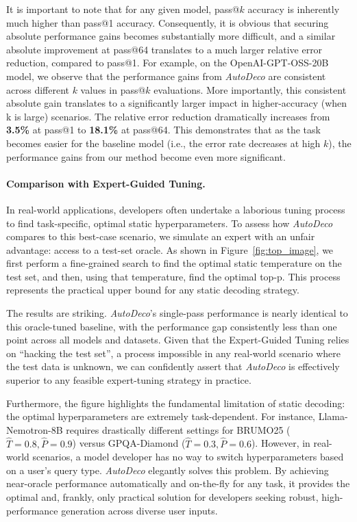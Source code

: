 It is important to note that for any given model, pass@$k$ accuracy is inherently much higher than pass@1 accuracy. Consequently, it is obvious that securing absolute performance gains becomes substantially more difficult, and a similar absolute improvement at pass@64 translates to a much larger relative error reduction, compared to pass@1. For example, on the OpenAI-GPT-OSS-20B model, we observe that the performance gains from \textit{AutoDeco} are consistent across different $k$ values in pass@$k$ evaluations. More importantly, this consistent absolute gain translates to a significantly larger impact in higher-accuracy (when k is large) scenarios. The relative error reduction dramatically increases from \textbf{3.5\%} at pass@1 to \textbf{18.1\%} at pass@64. This demonstrates that as the task becomes easier for the baseline model (i.e., the error rate decreases at high $k$), the performance gains from our method become even more significant.

\paragraph{Comparison with Expert-Guided Tuning.}
In real-world applications, developers often undertake a laborious tuning process to find task-specific, optimal static hyperparameters. To assess how \textit{AutoDeco} compares to this best-case scenario, we simulate an expert with an unfair advantage: access to a test-set oracle. As shown in Figure~\ref{fig:top_image}, we first perform a fine-grained search to find the optimal static temperature on the test set, and then, using that temperature, find the optimal top-p. This process represents the practical upper bound for any static decoding strategy.

The results are striking. \textit{AutoDeco}'s single-pass performance is nearly identical to this oracle-tuned baseline, with the performance gap consistently less than one point across all models and datasets. Given that the Expert-Guided Tuning relies on ``hacking the test set'', a process impossible in any real-world scenario where the test data is unknown, we can confidently assert that \textit{AutoDeco} is effectively superior to any feasible expert-tuning strategy in practice.

Furthermore, the figure highlights the fundamental limitation of static decoding: the optimal hyperparameters are extremely task-dependent. For instance, Llama-Nemotron-8B requires drastically different settings for BRUMO25 ($\hat{T}=0.8, \hat{P}=0.9$) versus GPQA-Diamond ($\hat{T} =0.3, \hat{P} =0.6$). However, in real-world scenarios, a model developer has no way to switch hyperparameters based on a user's query type. \textit{AutoDeco} elegantly solves this problem. By achieving near-oracle performance automatically and on-the-fly for any task, it provides the optimal and, frankly, only practical solution for developers seeking robust, high-performance generation across diverse user inputs.

